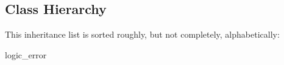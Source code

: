\subsection{Class Hierarchy}
This inheritance list is sorted roughly, but not completely, alphabetically\+:\begin{DoxyCompactList}
\item {}
\begin{DoxyCompactList}
\item {}
\end{DoxyCompactList}
\item logic\+\_\+error\begin{DoxyCompactList}
\item {}
\end{DoxyCompactList}
\item {}
\end{DoxyCompactList}

